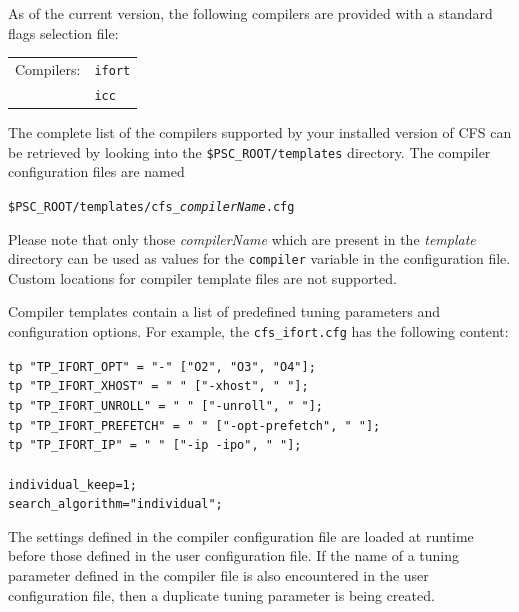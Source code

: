 \documentclass[11pt,a4paper, oneside]{book} %
\newenvironment{code}%
{
\addtolength{\leftskip}{0.5cm}}%
{

}
\begin{document}
As of the current version, the following compilers are provided with a standard flags selection file:

\begin{center}
\begin{tabular}[h]{ l  l }
Compilers:  & \texttt{ifort}\\
            & \texttt{icc}\\
\end{tabular}
\end{center}

The complete list of the compilers supported by your installed version of CFS can be retrieved by looking into the \texttt{\$PSC\_ROOT/templates} directory. The compiler configuration files are named

\begin{center}
\texttt{\$PSC\_ROOT/templates/cfs\_\textit{compilerName}.cfg}
\end{center}

Please note that only those \textit{compilerName} which are present in the \textit{template} directory can be used as values for the \texttt{compiler} variable in the configuration file. Custom locations for compiler template files are not supported.

Compiler templates contain a list of predefined tuning parameters and configuration options. For example, the \texttt{cfs\_ifort.cfg} has the following content:

\begin{code}
\texttt{tp "TP\_IFORT\_OPT" = "-" ["O2", "O3", "O4"];}\\
\texttt{tp "TP\_IFORT\_XHOST"  = " " ["-xhost", " "];}\\
\texttt{tp "TP\_IFORT\_UNROLL" = " " ["-unroll", " "];}\\
\texttt{tp "TP\_IFORT\_PREFETCH" = " " ["-opt-prefetch", " "];}\\
\texttt{tp "TP\_IFORT\_IP" = " " ["-ip -ipo", " "];}\\
\texttt{ }\\
\texttt{individual\_keep=1;}\\
\texttt{search\_algorithm="individual";}
\end{code}

The settings defined in the compiler configuration file are loaded at runtime before those defined in the user configuration file. If the name of a tuning parameter defined in the compiler file is also encountered in the user configuration file, then a duplicate tuning parameter is being created.
\end{document}
